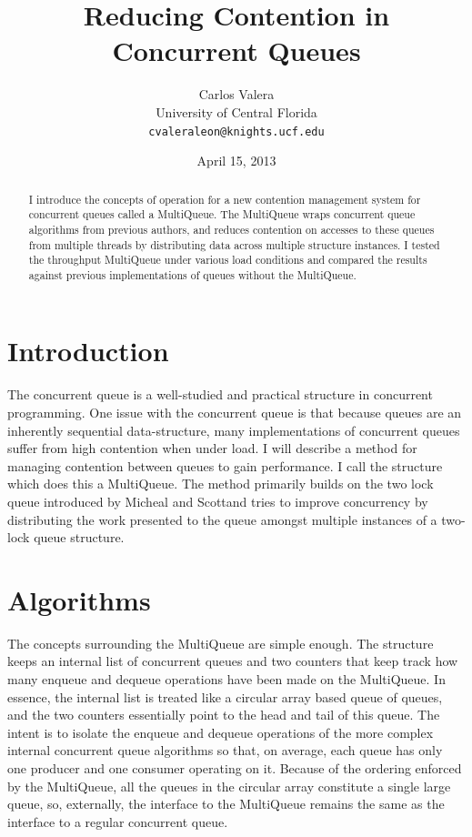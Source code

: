 \documentclass[12pt]{report}
\begin{document}
\title{Reducing Contention in Concurrent Queues}
\author{Carlos Valera \\
    University of Central Florida \\
    \texttt{cvaleraleon@knights.ucf.edu}}
\date{April 15, 2013}
\maketitle
\begin{abstract}
I introduce the concepts of operation for a new contention management system
for concurrent queues called a MultiQueue. The MultiQueue wraps concurrent
queue algorithms from previous authors, and reduces contention on accesses to
these queues from multiple threads by distributing data across multiple
structure instances. I tested the throughput MultiQueue under various
load conditions and compared the results against previous implementations of
queues without the MultiQueue.
\end{abstract}
\section{Introduction}
The concurrent queue is a well-studied and practical structure in concurrent
programming. One issue with the concurrent queue is that because queues are an
inherently sequential data-structure, many implementations of concurrent queues
suffer from high contention when under load. I will describe a method for
managing contention between queues to gain performance. I call the structure
which does this a MultiQueue. The method primarily builds on the two lock queue
introduced by Micheal and Scott\cite{michael1996}and tries to improve
concurrency by distributing the work presented to the queue amongst multiple
instances of a two-lock queue structure. 

\section{Algorithms}
The concepts surrounding the MultiQueue are simple enough. The structure keeps
an internal list of concurrent queues and two counters that keep track how many
enqueue and dequeue operations have been made on the MultiQueue. In essence,
the internal list is treated like a circular array based queue of queues, and
the two counters essentially point to the head and tail of this queue. The
intent is to isolate the enqueue and dequeue operations of the more complex
internal concurrent queue algorithms so that, on average, each queue has only
one producer and one consumer operating on it. Because of the ordering enforced
by the MultiQueue, all the queues in the circular array constitute a single
large queue, so, externally, the interface to the MultiQueue remains the same
as the interface to a regular concurrent queue.
\end{document}
